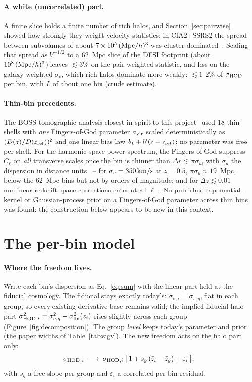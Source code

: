 \documentclass[11pt]{article}
\newcommand{\sv}{\sigma_v}
\newcommand{\svg}{\sigma_{v,g}}
\newcommand{\slin}{\sigma_{\rm lin}}
\newcommand{\shod}{\sigma_{\rm HOD}}
\newcommand{\kms}{\,{\rm km/s}}
\begin{document}
\paragraph{A white (uncorrelated) part.}
A finite slice holds a finite number of rich halos, and
Section~\ref{sec:pairwise} showed how strongly they weight velocity
statistics: in CfA2+SSRS2 the spread between subvolumes of about
$7 \times 10^5\,({\rm Mpc}/h)^3$ was cluster
dominated~\cite{Marzke1995}.  Scaling that spread as
$V^{-1/2}$ to a $62$~Mpc slice of the DESI footprint (about
$10^8\,({\rm Mpc}/h)^3$) leaves $\lesssim 3\%$ on the pair-weighted
statistic, and less on the galaxy-weighted $\sv$, which rich halos
dominate more weakly: $\lesssim 1$--$2\%$ of $\shod$ per bin, with
$L$ of about one bin (crude estimate).

\paragraph{Thin-bin precedents.}
The BOSS tomographic analysis closest in spirit to this
project~\cite{SalazarAlbornoz2017} used $18$ thin shells with
\emph{one} Fingers-of-God parameter $a_{\rm vir}$ scaled
deterministically as $(D(z)/D(z_{\rm ref}))^2$ and one linear bias
law $b_1 + b'(z - z_{\rm ref})$: no parameter was free per shell.
For the harmonic-space power spectrum, the Fingers of God suppress
$C_\ell$ on \emph{all} transverse scales once the bin is thinner than
$\Delta r \lesssim \pi\sigma_u$, with $\sigma_u$ the dispersion in
distance units~\cite{GrasshornGebhardt2020} -- for
$\sv = 350\kms$ at $z = 0.5$, $\pi\sigma_u \approx 19$~Mpc, below the
$62$~Mpc bins but not by orders of magnitude; and for
$\Delta z \lesssim 0.01$ nonlinear redshift-space corrections enter
at all $\ell$~\cite{Jalilvand2020}.  No published exponential-kernel
or Gaussian-process prior on a Fingers-of-God parameter across thin
bins was found: the construction below appears to be new in this
context.

\section{The per-bin model}
\label{sec:model}

\paragraph{Where the freedom lives.}
Write each bin's dispersion as Eq.~\eqref{eq:sum} with the linear
part held at the fiducial cosmology.  The fiducial stays exactly
today's: $\sv{}_{,i} = \svg$, flat in each group, so every existing
derivative base remains valid; the implied fiducial halo part
$\shod^2{}_{,i} = \svg^2 - \slin^2(\bar{z}_i)$ rises slightly across
each group (Figure~\ref{fig:decomposition}).  The group \emph{level}
keeps today's parameter and prior (the paper widths of
Table~\ref{tab:sigv}).  The new freedom acts on the halo part only:
\begin{equation}
  \shod{}_{,i} \;\longrightarrow\; \shod{}_{,i}\,
  \bigl[\,1 + s_g\,(\bar{z}_i - \bar{z}_g) + \varepsilon_i\,\bigr] ,
  \label{eq:perbin}
\end{equation}
with $s_g$ a free slope per group and $\varepsilon_i$ a correlated
per-bin residual.
\end{document}
